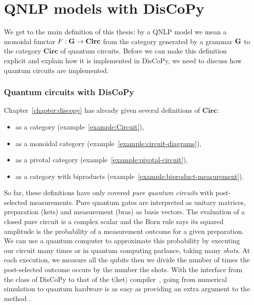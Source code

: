 
\section{QNLP models with DisCoPy}

We get to the main definition of this thesis: by a QNLP model we mean a monoidal functor $F : \mathbf{G} \to \mathbf{Circ}$ from the category generated by a grammar $\mathbf{G}$ to the category $\mathbf{Circ}$ of quantum circuits.
Before we can make this definition explicit and explain how it is implemented in DisCoPy, we need to discuss how quantum circuits are implemented.

\subsubsection{Quantum circuits with DisCoPy}

Chapter~\ref{chapter:discopy} has already given several definitions of $\mathbf{Circ}$:
\begin{itemize}
    \item as a category (example~\ref{example:Circuit}),
    \item as a monoidal category (example~\ref{example:circuit-diagrams}),
    \item as a pivotal category (example~\ref{example:pivotal-circuit}),
    \item as a category with biproducts (example~\ref{example:biproduct-measurement}).
\end{itemize}
So far, these definitions have only covered \emph{pure quantum circuits} with post-selected measurements. Pure quantum gates are interpreted as unitary matrices, preparation (kets) and measurement (bras) as basis vectors.
The evaluation of a closed pure circuit is a complex scalar and the Born rule says its squared amplitude is the probability of a measurement outcome for a given preparation.
We can use a quantum computer to approximate this probability by executing our circuit many times or in quantum computing parlance, taking many \emph{shots}.
At each execution, we measure all the qubits then we divide the number of times the post-selected outcome occurs by the number the shots.
With the interface from the  class of DisCoPy to that of the t$\vert$ket$\rangle$ compiler~\cite{SivarajahEtAl20}, going from numerical simulation to quantum hardware is as easy as providing an extra argument  to the method .

